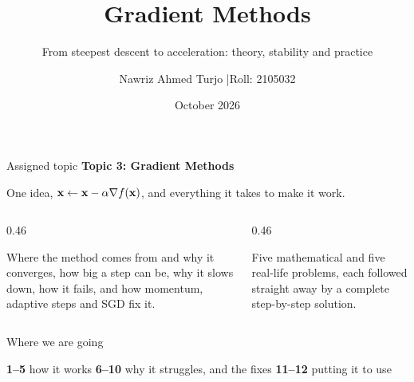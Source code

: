 \documentclass[aspectratio=169, 11pt]{beamer}
\title{Gradient Methods}
\subtitle{From steepest descent to acceleration: theory, stability and practice}
\author{Nawriz Ahmed Turjo \quad|\quad Roll: 2105032}
\institute{CSE 402: Numerical Methods \quad|\quad Assignment Topic 3}
\date{October 2026}
\begin{document}
\maketitle

\begin{frame}{Assigned topic}
  \centering
  \vspace{6pt}
  {\Large\textbf{Topic 3: Gradient Methods}}

  \vspace{4pt}
  {\small One idea, $\mathbf{x}\gets\mathbf{x}-\alpha\nabla f(\mathbf{x})$, and everything it takes to make it work.}

  \vspace{12pt}
  \begin{columns}[T]
    \begin{column}{0.46\textwidth}
      \begin{keybox}
        \small Where the method comes from and why it converges, how big a step can be, why it slows down,
        how it fails, and how momentum, adaptive steps and SGD fix it.
      \end{keybox}
    \end{column}
    \begin{column}{0.46\textwidth}
      \begin{probbox}
        \small Five mathematical and five real-life problems, each followed straight away by a complete
        step-by-step solution.
      \end{probbox}
    \end{column}
  \end{columns}
\end{frame}

\begin{frame}{Where we are going}
  \centering
  \vspace{6pt}
  

  \vspace{8pt}
  \footnotesize
  \textcolor{mDarkTeal}{\textbf{1--5}} how it works \qquad
  \textcolor{mOrange}{\textbf{6--10}} why it struggles, and the fixes \qquad
  \textcolor{mGreen}{\textbf{11--12}} putting it to use
\end{frame}

\end{document}
